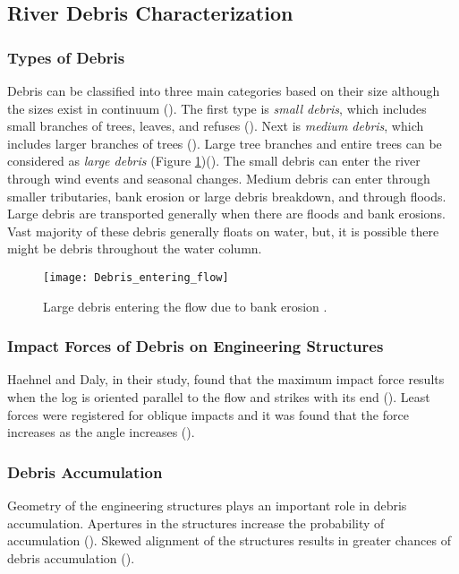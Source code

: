 \subsection{River Debris Characterization}
\subsubsection{Types of Debris}
Debris can be classified into three main categories based on their size although the sizes exist in continuum (\cite{Reference1}). The first type is \textit{small debris}, which includes small branches of trees, leaves, and refuses (\cite{Reference1}). Next is \textit{medium debris}, which includes larger branches of trees (\cite{Reference1}). Large tree branches and entire trees can be considered as \textit{large debris} (Figure \ref{fig:Debris_entering_flow})(\cite{Reference1}). The small debris can enter the river through wind events and seasonal changes. Medium debris can enter through smaller tributaries, bank erosion or large debris breakdown, and through floods. Large debris are transported generally when there are floods and bank erosions. Vast majority of these debris generally floats on water, but, it is possible there might be debris throughout the water column.
\begin{figure}
\centering
\texttt{[image: Debris\_entering\_flow]}
\caption{\label{fig:Debris_entering_flow}Large debris entering the flow due to bank erosion \citep{Reference1}.}
\end{figure}

\subsubsection{Impact Forces of Debris on Engineering Structures}
Haehnel and Daly, in their study, found that the maximum impact force results when the log is oriented parallel to the flow and strikes with its end (\cite{Reference2}). Least forces were registered for oblique impacts and it was found that the force increases as the angle increases (\cite{Reference2}). 
\subsubsection{Debris Accumulation}
Geometry of the engineering structures plays an important role in debris accumulation. Apertures in the structures increase the probability of accumulation (\cite{Reference3}). Skewed alignment of the structures results in greater chances of debris accumulation (\cite{Reference3}).

